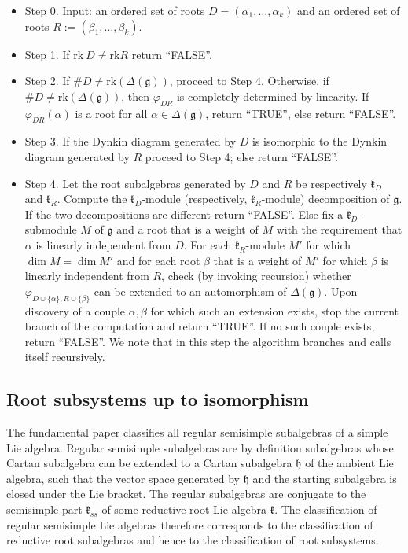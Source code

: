 \documentclass[12pt]{report}
\newcommand {\QQ} {\mathbb {Q}}
\newcommand{\kk}{\mathfrak{k}}
\newcommand{\hh}{\mathfrak{h}}
\newcommand{\gG}{\mathfrak{g}}
\renewcommand {\phi} {\varphi}
\newcommand{\linspan}{\mathrm{span}}
\newcommand{\rk}{\mathrm{rk}}
\begin{document}
\begin{itemize}
\item Step 0. Input: an ordered set of roots $D=(\alpha_1,\dots,\alpha_k)$ and an ordered set of roots $R:=(\beta_1,\dots, \beta_k)$. %
\item Step 1. If $\rk~D\neq \rk R$ return ``FALSE''.
\item Step 2. If $\#D\neq\rk(\Delta(\gG))$, proceed to Step 4. Otherwise, if $\#D\neq\rk(\Delta(\gG))$, then  $\phi_{DR}$ is completely determined by linearity. If $\phi_{DR}(\alpha)$ is a root for all $\alpha\in\Delta(\gG)$, return ``TRUE'', else return ``FALSE''.
\item Step 3. If the Dynkin diagram generated by $D$ is isomorphic to the Dynkin diagram generated by $R$ proceed to Step 4; else return ``FALSE''.
\item Step 4. Let the root subalgebras generated by $D$ and $R$ be respectively  $\kk_D$ and $\kk_R$. Compute the $\kk_D$-module (respectively, $\kk_R$-module) decomposition of $\gG$. If the two decompositions are different return ``FALSE''. Else fix a $\kk_D$-submodule $M$ of $\gG$ and a root that is a weight of $M$ with the requirement that $\alpha$ is linearly independent from $D$. For each $\kk_R$-module $M'$ for which $\dim M=\dim M'$ and for each root $\beta$ that is a weight of $M'$ for which $\beta$ is linearly independent from $R$, check (by invoking recursion) whether $\phi_{D\cup\{\alpha\}, R\cup\{\beta\} }$ can be extended to an automorphism of $\Delta(\gG)$. Upon discovery of a couple $\alpha, \beta$ for which such an extension exists, stop the current branch of the computation and return ``TRUE''. If no such couple exists, return ``FALSE''. We note that in this step the algorithm branches and calls itself recursively.
\end{itemize}

\subsection{Root subsystems up to isomorphism}
The fundamental paper \cite{Dynkin:Semisimple} classifies all regular semisimple subalgebras of a simple Lie algebra. Regular semisimple subalgebras are by definition subalgebras whose Cartan subalgebra can be extended to a Cartan subalgebra $\hh$ of the ambient Lie algebra, such that the vector space generated by $\hh$ and the starting subalgebra is closed under the Lie bracket. The regular subalgebras are conjugate to the semisimple part $\kk_{ss}$  of some reductive root Lie algebra $\kk$. The classification of regular semisimple Lie algebras therefore corresponds to the classification of reductive root subalgebras and hence to the classification of root subsystems. 
\end{document}
